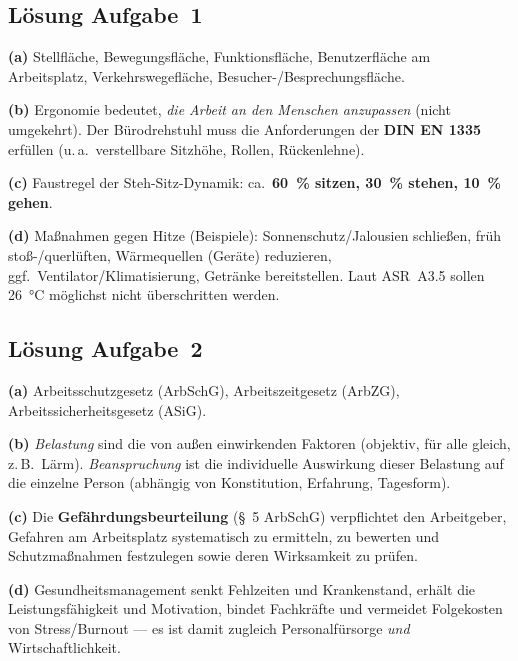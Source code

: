 \documentclass[11pt, a4paper]{article}
\begin{document}
\subsection*{Lösung Aufgabe~1}
\begin{loesung}
\textbf{(a)} Stellfläche, Bewegungsfläche, Funktionsfläche, Benutzerfläche am Arbeitsplatz,
Verkehrswegefläche, Besucher-/Besprechungsfläche.

\textbf{(b)} Ergonomie bedeutet, \emph{die Arbeit an den Menschen anzupassen} (nicht
umgekehrt). Der Bürodrehstuhl muss die Anforderungen der \textbf{DIN EN 1335} erfüllen
(u.\,a.\ verstellbare Sitzhöhe, Rollen, Rückenlehne).

\textbf{(c)} Faustregel der Steh-Sitz-Dynamik: ca.\ \textbf{60~\% sitzen, 30~\% stehen,
10~\% gehen}.

\textbf{(d)} Maßnahmen gegen Hitze (Beispiele): Sonnenschutz/Jalousien schließen,
früh stoß-/querlüften, Wärmequellen (Geräte) reduzieren, ggf.\ Ventilator/Klimatisierung,
Getränke bereitstellen. Laut ASR~A3.5 sollen 26~°C möglichst nicht überschritten werden.
\end{loesung}

\subsection*{Lösung Aufgabe~2}
\begin{loesung}
\textbf{(a)} Arbeitsschutzgesetz (ArbSchG), Arbeitszeitgesetz (ArbZG),
Arbeitssicherheitsgesetz (ASiG).

\textbf{(b)} \emph{Belastung} sind die von außen einwirkenden Faktoren (objektiv, für alle
gleich, z.\,B.\ Lärm). \emph{Beanspruchung} ist die individuelle Auswirkung dieser
Belastung auf die einzelne Person (abhängig von Konstitution, Erfahrung, Tagesform).

\textbf{(c)} Die \textbf{Gefährdungsbeurteilung} (\S~5 ArbSchG) verpflichtet den
Arbeitgeber, Gefahren am Arbeitsplatz systematisch zu ermitteln, zu bewerten und
Schutzmaßnahmen festzulegen sowie deren Wirksamkeit zu prüfen.

\textbf{(d)} Gesundheitsmanagement senkt Fehlzeiten und Krankenstand, erhält die
Leistungsfähigkeit und Motivation, bindet Fachkräfte und vermeidet Folgekosten von
Stress/Burnout --- es ist damit zugleich Personalfürsorge \emph{und} Wirtschaftlichkeit.
\end{loesung}
\end{document}
